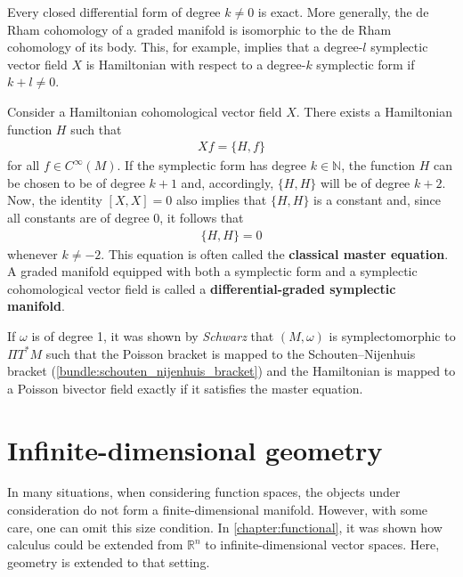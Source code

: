     \begin{property}\label{hdg:global_exactness}
        Every closed differential form of degree $k\neq0$ is exact. More generally, the de Rham cohomology of a graded manifold is isomorphic to the de Rham cohomology of its body. This, for example, implies that a degree-$l$ symplectic vector field $X$ is Hamiltonian with respect to a degree-$k$ symplectic form if $k+l\neq0$.
    \end{property}
    \begin{result}
        Consider a Hamiltonian cohomological vector field $X$. There exists a Hamiltonian function $H$ such that
        \begin{gather}
            Xf = \{H,f\}
        \end{gather}
        for all $f\in C^\infty(M)$. If the symplectic form has degree $k\in\mathbb{N}$, the function $H$ can be chosen to be of degree $k+1$ and, accordingly, $\{H,H\}$ will be of degree $k+2$. Now, the identity $[X,X] = 0$ also implies that $\{H,H\}$ is a constant and, since all constants are of degree 0, it follows that
        \begin{gather}
            \label{hdg:classical_master_equation}
            \{H,H\}=0
        \end{gather}
        whenever $k\neq-2$. This equation is often called the \textbf{classical master equation}. A graded manifold equipped with both a symplectic form and a symplectic cohomological vector field is called a \textbf{differential-graded symplectic manifold}.

        If $\omega$ is of degree 1, it was shown by \textit{Schwarz} that $(M,\omega)$ is symplectomorphic to $\Pi T^*M$ such that the Poisson bracket is mapped to the Schouten--Nijenhuis bracket (\cref{bundle:schouten_nijenhuis_bracket}) and the Hamiltonian is mapped to a Poisson bivector field exactly if it satisfies the master equation.
    \end{result}

\section{Infinite-dimensional geometry}\label{section:infinite_dimensional}

    In many situations, when considering function spaces, the objects under consideration do not form a finite-dimensional manifold. However, with some care, one can omit this size condition. In \cref{chapter:functional}, it was shown how calculus could be extended from $\mathbb{R}^n$ to infinite-dimensional vector spaces. Here, geometry is extended to that setting.

